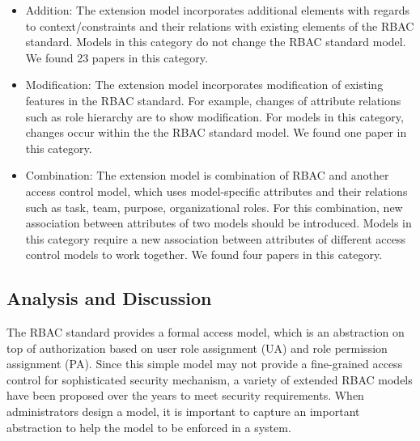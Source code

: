 \begin{itemize}
	\item Addition: The extension model incorporates additional elements with regards to context/constraints and their relations with existing elements of the RBAC standard. Models in this category do not change the RBAC standard model. We found 23 papers in this category.
	\item Modification: The extension model incorporates modification of existing features in the RBAC standard. For example, changes of attribute relations such as role hierarchy are to show modification. For models in this category, changes occur within the the RBAC standard model. We found one paper in this category.
	\item Combination: The extension model is combination of RBAC and another access control model, which uses model-specific attributes and their relations such as task, team, purpose, organizational roles. For this combination, new association between attributes of two models should be introduced. Models in this category require a new association between attributes of different access control models to work together. We found four papers in this category.
\end{itemize}

%
%
%

\subsection{Analysis and Discussion}

The RBAC standard provides a formal access model, which is an abstraction on top of authorization based on user role assignment (UA) and role
permission assignment (PA). Since this simple model may not provide a fine-grained access control for sophisticated
security mechanism, a variety of extended RBAC models have been proposed over the years to meet
security requirements. When administrators design a model, it is important to capture an important abstraction to help the model to be enforced in a system.

